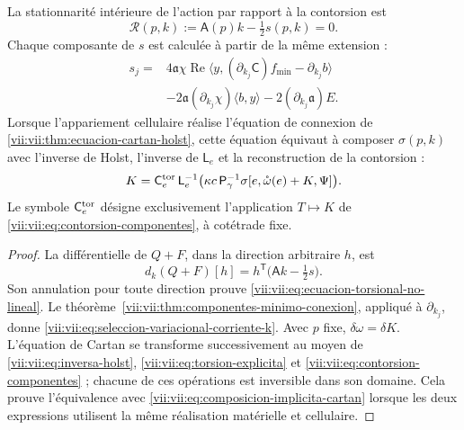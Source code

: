 \begin{proposition}
\label{vii:vii:prop:ecuacion-torsional-no-lineal}
La stationnarité intérieure de l'action par rapport à la contorsion est
\begin{equation}
 \mathcal R(p,k):=\mathsf A(p)k-\tfrac12s(p,k)=0.
 \label{vii:vii:eq:ecuacion-torsional-no-lineal}
\end{equation}
Chaque composante de \(s\) est calculée à partir de la même extension :
\begin{equation}
 \begin{split}
 s_j={}&4\mathfrak a\chi\operatorname{Re}
       \langle y,(\partial_{k_j}\mathsf C)f_{\min}
                         -\partial_{k_j}b\rangle\\
 &-2\mathfrak a(\partial_{k_j}\chi)\langle b,y\rangle
       -2(\partial_{k_j}\mathfrak a)E.
 \end{split}
 \label{vii:vii:eq:seleccion-variacional-corriente-k}
\end{equation}
Lorsque l'appariement cellulaire réalise l'équation de connexion de
\ref{vii:vii:thm:ecuacion-cartan-holst}, cette équation équivaut à composer
\(\sigma(p,k)\) avec l'inverse de Holst, l'inverse de
\(\mathsf L_e\) et la reconstruction de la contorsion :
\begin{equation}
 K=\mathsf C_e^{\rm tor}\,\mathsf L_e^{-1}
           \bigl(\kappa c\,\mathsf P_\gamma^{-1}
             \sigma[e,\mathring\omega(e)+K,\Psi]\bigr).
 \label{vii:vii:eq:composicion-implicita-cartan}
\end{equation}
Le symbole \(\mathsf C_e^{\rm tor}\) désigne exclusivement l'application \(T\mapsto K\) de \eqref{vii:vii:eq:contorsion-componentes}, à cotétrade fixe.
\end{proposition}

\begin{proof}
La différentielle de \(Q+F\), dans la direction arbitraire \(h\), est
\[
 d_k(Q+F)[h]
   =h^{\mathsf T}\bigl(\mathsf A k-\tfrac12s\bigr).
\]
Son annulation pour toute direction prouve \eqref{vii:vii:eq:ecuacion-torsional-no-lineal}. Le théorème~\ref{vii:vii:thm:componentes-minimo-conexion}, appliqué à \(\partial_{k_j}\), donne \eqref{vii:vii:eq:seleccion-variacional-corriente-k}. Avec \(p\) fixe, \(\delta\omega=\delta K\). L'équation de Cartan se transforme successivement au moyen de \eqref{vii:vii:eq:inversa-holst}, \eqref{vii:vii:eq:torsion-explicita} et \eqref{vii:vii:eq:contorsion-componentes} ; chacune de ces opérations est inversible dans son domaine. Cela prouve l'équivalence avec \eqref{vii:vii:eq:composicion-implicita-cartan} lorsque les deux expressions utilisent la même réalisation matérielle et cellulaire.
\end{proof}

